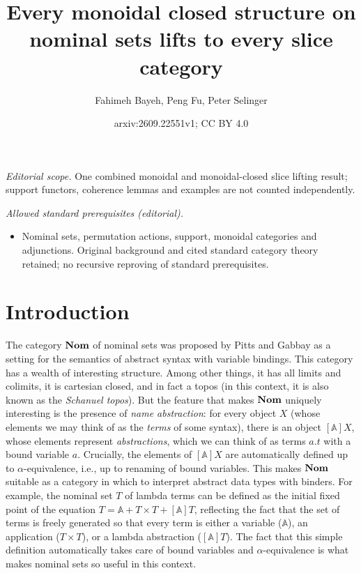 \documentclass[11pt,a4paper]{amsart}
\title{Every monoidal closed structure on nominal sets lifts to every slice category}
\author{Fahimeh Bayeh, Peng Fu, Peter Selinger}
\date{arxiv:2609.22551v1; CC BY 4.0}
\theoremstyle{plain}
\theoremstyle{definition}
\theoremstyle{remark}
\newcommand{\Nom}{\textrm{\bf Nom}}
\newcommand{\aA}{\mathbb{A}}
\begin{document}
\maketitle
\noindent\textit{Editorial scope.} One combined monoidal and monoidal-closed slice lifting result; support functors, coherence lemmas and examples are not counted independently.\par\medskip
\noindent\textit{Allowed standard prerequisites (editorial).}\begin{itemize}
\item Nominal sets, permutation actions, support, monoidal categories and adjunctions. Original background and cited standard category theory retained; no recursive reproving of standard prerequisites.
\end{itemize}\medskip
\section{Introduction}

The category $\Nom$ of nominal sets was proposed by Pitts and Gabbay
{\cite{GabbayPitts1999,GabbayPitts2002}} as a setting for the semantics of abstract
syntax with variable bindings. This category has a wealth of
interesting structure. Among other things, it has all limits and
colimits, it is cartesian closed, and in fact a topos (in this
context, it is also known as the \emph{Schanuel topos}). But the
feature that makes $\Nom$ uniquely interesting is the presence of
\emph{name abstraction}: for every object $X$ (whose elements we may
think of as the \emph{terms} of some syntax), there is an object
$[\aA]X$, whose elements represent \emph{abstractions}, which we can
think of as terms $a.t$ with a bound variable $a$. Crucially, the
elements of $[\aA]X$ are automatically defined up to
$\alpha$-equivalence, i.e., up to renaming of bound variables. This
makes $\Nom$ suitable as a category in which to interpret abstract
data types with binders. For example, the nominal set $T$ of lambda terms can be defined as the initial fixed point of
the equation $T = \aA + T\times T + [\aA]T$, reflecting the fact that
the set of terms is freely generated so that every term is either a
variable ($\aA$), an application ($T\times T$), or a lambda
abstraction ($[\aA]T$). The fact that this simple definition
automatically takes care of bound variables and $\alpha$-equivalence
is what makes nominal sets so useful in this context.
\end{document}
